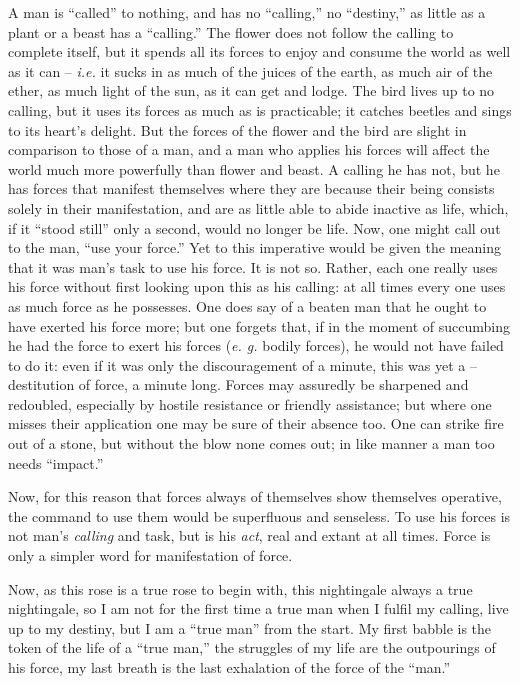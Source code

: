 \documentclass[12pt,a4paper]{book}
\begin{document}
A man is ``called'' to nothing, and has no ``calling,'' no ``destiny,'' 
as little as a plant or a beast has a ``calling.'' The flower does not 
follow the calling to complete itself, but it spends all its forces to enjoy 
and consume the world as well as it can -- \textit{i.e.} it sucks in as much 
of the juices of the earth, as much air of the ether, as much light of the 
sun, as it can get and lodge. The bird lives up to no calling, but it uses its 
forces as much as is practicable; it catches beetles and sings to its heart's 
delight. But the forces of the flower and the bird are slight in comparison to 
those of a man, and a man who applies his forces will affect the world much 
more powerfully than flower and beast. A calling he has not, but he has forces 
that manifest themselves where they are because their being consists solely in 
their manifestation, and are as little able to abide inactive as life, which, 
if it ``stood still'' only a second, would no longer be life. Now, one might 
call out to the man, ``use your force.'' Yet to this imperative would be 
given the meaning that it was man's task to use his force. It is not so. 
Rather, each one really uses his force without first looking upon this as his 
calling: at all times every one uses as much force as he possesses. One does 
say of a beaten man that he ought to have exerted his force more; but one 
forgets that, if in the moment of succumbing he had the force to exert his 
forces (\textit{e. g.} bodily forces), he would not have failed to do it: even 
if it was only the discouragement of a minute, this was yet a --destitution of 
force, a minute long. Forces may assuredly be sharpened and redoubled, 
especially by hostile resistance or friendly assistance; but where one misses 
their application one may be sure of their absence too. One can strike fire 
out of a stone, but without the blow none comes out; in like manner a man too 
needs ``impact.''

Now, for this reason that forces always of themselves show themselves 
operative, the command to use them would be superfluous and senseless. To use 
his forces is not man's \textit{calling} and task, but is his \textit{act}, 
real and extant at all times. Force is only a simpler word for manifestation 
of force.

Now, as this rose is a true rose to begin with, this nightingale always a true 
nightingale, so I am not for the first time a true man when I fulfil my 
calling, live up to my destiny, but I am a ``true man'' from the start. My 
first babble is the token of the life of a ``true man,'' the struggles of my 
life are the outpourings of his force, my last breath is the last exhalation 
of the force of the ``man.''
\end{document}
